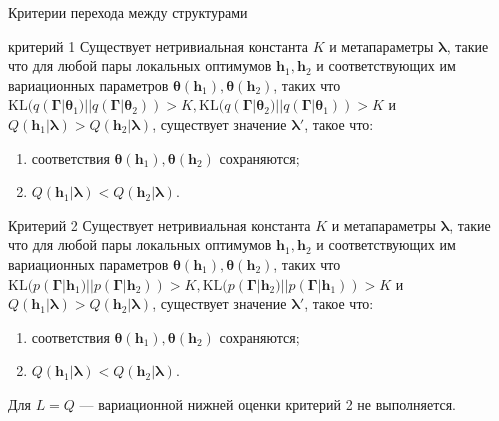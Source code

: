 \documentclass[10pt,pdf,utf8,russian,aspectratio=169]{beamer}
\begin{document}
\begin{frame}{Критерии перехода между структурами}
\small
\begin{block}{критерий 1}
Существует нетривиальная константа $K$ и метапараметры $\boldsymbol{\lambda}$, такие что для любой пары локальных оптимумов $\mathbf{h}_1, \mathbf{h}_2$ и соответствующих им вариационных параметров $\boldsymbol{\theta}(\mathbf{h}_1), \boldsymbol{\theta}(\mathbf{h}_2)$, таких что $\text{KL}(q(\boldsymbol{\Gamma}|\boldsymbol{\theta}_1)||q(\boldsymbol{\Gamma}|\boldsymbol{\theta}_2))>K, \text{KL}(q(\boldsymbol{\Gamma}|\boldsymbol{\theta}_2)||q(\boldsymbol{\Gamma}|\boldsymbol{\theta}_1))>K$ и $Q(\mathbf{h}_1|\boldsymbol{\lambda}) > Q(\mathbf{h}_2|\boldsymbol{\lambda})$,  существует значение $\boldsymbol{\lambda}'$, такое что:
\begin{enumerate}
\item соответствия $\boldsymbol{\theta}(\mathbf{h}_1), \boldsymbol{\theta}(\mathbf{h}_2)$ сохраняются;
\item $Q(\mathbf{h}_1|\boldsymbol{\lambda}) < Q(\mathbf{h}_2|\boldsymbol{\lambda}).$
\end{enumerate}
\end{block}

\begin{block}{Критерий 2}
Существует нетривиальная константа $K$ и метапараметры $\boldsymbol{\lambda}$, такие что для любой пары локальных оптимумов $\mathbf{h}_1, \mathbf{h}_2$ и соответствующих им вариационных параметров $\boldsymbol{\theta}(\mathbf{h}_1), \boldsymbol{\theta}(\mathbf{h}_2)$, таких что $\text{KL}(p(\boldsymbol{\Gamma}|\mathbf{h}_1)||p(\boldsymbol{\Gamma}|\mathbf{h}_2))>K, \text{KL}(p(\boldsymbol{\Gamma}|\mathbf{h}_2)||p(\boldsymbol{\Gamma}|\mathbf{h}_1))>K$ и $Q(\mathbf{h}_1|\boldsymbol{\lambda}) > Q(\mathbf{h}_2|\boldsymbol{\lambda})$,  существует значение $\boldsymbol{\lambda}'$, такое что:
\begin{enumerate}
\item соответствия $\boldsymbol{\theta}(\mathbf{h}_1), \boldsymbol{\theta}(\mathbf{h}_2)$ сохраняются;
\item $Q(\mathbf{h}_1|\boldsymbol{\lambda}) < Q(\mathbf{h}_2|\boldsymbol{\lambda}).$
\end{enumerate}
\end{block}

Для $L = Q $ --- вариационной нижней оценки критерий 2 не выполняется.
\end{frame}
\end{document}
